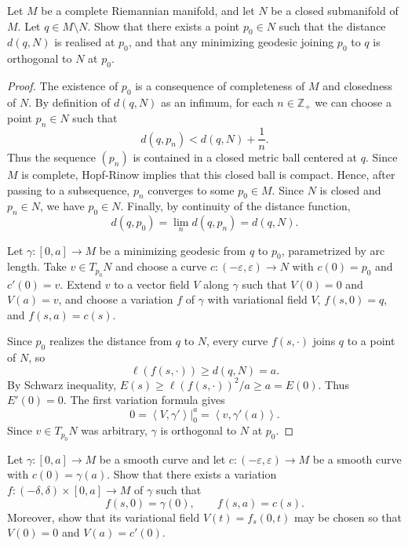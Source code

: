 \documentclass{book}
\begin{document}
\begin{exercise}
\label{exercise-first-var-submfd-dist}
\begin{reference}
\cite[XIX]{doc}
\end{reference}
Let $M$ be a complete Riemannian manifold,
and let $N$ be a closed submanifold of $M$.
Let $q \in M\setminus N$. Show that
there exists a point $p_0 \in N$
such that the distance $d(q,N)$ is
realised at $p_0$, and that
any minimizing geodesic joining $p_0$ to $q$
is orthogonal to $N$ at $p_0$.
\end{exercise}

\begin{proof}
The existence of $p_0$ is a consequence of
completeness of $M$ and closedness of $N$.
By definition of $d(q,N)$ as an infimum, for
each $n \in \mathbb{Z}_+$ we can choose a
point $p_n \in N$ such that
$$
d(q,p_n)<d(q,N)+\frac{1}{n}.
$$
Thus the sequence $(p_n)$ is contained in a
closed metric ball centered at $q$. Since $M$
is complete, Hopf-Rinow implies that this
closed ball is compact. Hence, after passing
to a subsequence, $p_n$ converges to some
$p_0 \in M$. Since $N$ is closed and
$p_n \in N$, we have $p_0 \in N$. Finally,
by continuity of the distance function,
$$
d(q,p_0)=\lim_n d(q,p_n)=d(q,N).
$$

Let $\gamma:[0,a] \to M$ be a minimizing
geodesic from $q$ to $p_0$, parametrized by
arc length. Take $v\in T_{p_0}N$ and choose a
curve $c:(-\varepsilon,\varepsilon)\to N$
with $c(0)=p_0$ and $c'(0)=v$. Extend $v$ to
a vector field $V$ along $\gamma$ such that
$V(0)=0$ and $V(a)=v$, and choose a variation
$f$ of $\gamma$ with variational field $V$,
$f(s,0)=q$, and $f(s,a)=c(s)$.

Since $p_0$ realizes the distance from $q$ to
$N$, every curve $f(s,\cdot)$ joins $q$ to a
point of $N$, so
$$
\ell(f(s,\cdot))\geq d(q,N)=a.
$$
By Schwarz inequality,
$E(s)\geq \ell(f(s,\cdot))^2/a\geq a=E(0)$.
Thus $E'(0)=0$. The first variation formula
gives
$$
0=\left\langle{}V,\gamma'\right\rangle{}|_0^a
=\left\langle{}v,\gamma'(a)\right\rangle{}.
$$
Since $v\in T_{p_0}N$ was arbitrary, $\gamma$
is orthogonal to $N$ at $p_0$.
\end{proof}

\begin{exercise}
\label{exercise-endpoint-variation}
Let $\gamma:[0,a]\to M$ be a smooth curve and
let $c:(-\varepsilon,\varepsilon)\to M$ be a
smooth curve with $c(0)=\gamma(a)$. Show that
there exists a variation
$f:(-\delta,\delta)\times[0,a]\to M$ of
$\gamma$ such that
$$
f(s,0)=\gamma(0),\qquad f(s,a)=c(s).
$$
Moreover, show that its variational field
$V(t)=f_s(0,t)$ may be chosen so that
$V(0)=0$ and $V(a)=c'(0)$.
\end{exercise}
\end{document}
